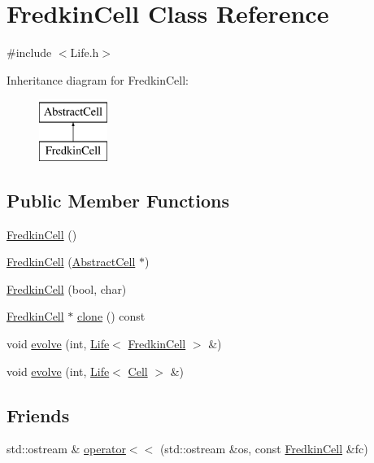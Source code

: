 \hypertarget{classFredkinCell}{\section{Fredkin\-Cell Class Reference}
\label{classFredkinCell}
}


{\ttfamily \#include $<$Life.\-h$>$}

Inheritance diagram for Fredkin\-Cell\-:\begin{figure}[H]
\begin{center}
\leavevmode
\includegraphics[height=2.000000cm]{classFredkinCell}
\end{center}
\end{figure}
\subsection*{Public Member Functions}
\begin{DoxyCompactItemize}
\item 
\hyperlink{classFredkinCell_ac5bd5726da496a3b3363d9c1b57dccc2}{Fredkin\-Cell} ()
\item 
\hyperlink{classFredkinCell_ada8085f136a647986a3632548d3265e2}{Fredkin\-Cell} (\hyperlink{classAbstractCell}{Abstract\-Cell} $\ast$)
\item 
\hyperlink{classFredkinCell_acc74f231934d691ec6db3346fe1b2c3e}{Fredkin\-Cell} (bool, char)
\item 
\hyperlink{classFredkinCell}{Fredkin\-Cell} $\ast$ \hyperlink{classFredkinCell_a05d7cd1308b23d514e207317fdf06235}{clone} () const 
\item 
void \hyperlink{classFredkinCell_a50b4c7fd707a474c8ddeaefc09818a04}{evolve} (int, \hyperlink{classLife}{Life}$<$ \hyperlink{classFredkinCell}{Fredkin\-Cell} $>$ \&)
\item 
void \hyperlink{classFredkinCell_a662b6ad6a17cda14b4563a17c6ae4eed}{evolve} (int, \hyperlink{classLife}{Life}$<$ \hyperlink{classCell}{Cell} $>$ \&)
\end{DoxyCompactItemize}
\subsection*{Friends}
\begin{DoxyCompactItemize}
\item 
std\-::ostream \& \hyperlink{classFredkinCell_a360e2938139d0e8a1f080b9f8b26a5b8}{operator$<$$<$} (std\-::ostream \&os, const \hyperlink{classFredkinCell}{Fredkin\-Cell} \&fc)
\end{DoxyCompactItemize}

